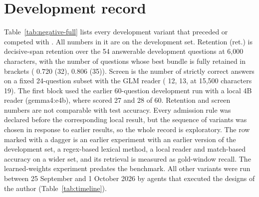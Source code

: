 \documentclass[preprint,12pt]{elsarticle}
\begin{document}
\section{Development record}
\label{app:negative}
Table~\ref{tab:negative-full} lists every development variant that preceded or competed with \lexb{}.
All numbers in it are on the development set.
Retention (ret.) is decisive-span retention over the 54 answerable development questions at 6,000 characters, with the number of questions whose best bundle is fully retained in brackets (\hybrid{} 0.720 (32), \hr{} 0.806 (35)).
Screen is the number of strictly correct answers on a fixed 24-question subset with the GLM reader (\hybrid{} 12, \hr{} 13, \hybrid{} at 15,500 characters 19).
The first block used the earlier 60-question development run with a local 4B reader (gemma4:e4b), where \hybrid{} scored 27 and \hr{} 28 of 60.
Retention and screen numbers are not comparable with test accuracy.
Every admission rule was declared before the corresponding local result, but the sequence of variants was chosen in response to earlier results, so the whole record is exploratory.
The row marked with a dagger is an earlier experiment with an earlier version of the development set, a regex-based lexical method, a local reader and match-based accuracy on a wider set, and its retrieval is measured as gold-window recall.
The learned-weights experiment predates the benchmark.
All other variants were run between 25 September and 1 October 2026 by agents that executed the designs of the author (Table~\ref{tab:timeline}).

\end{document}
